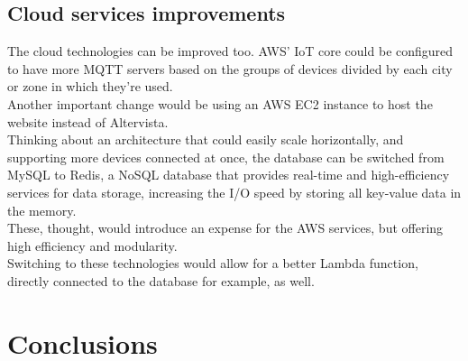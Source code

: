 \documentclass[conference]{IEEEtran}
\begin{document}
	\subsection{Cloud services improvements}
		The cloud technologies can be improved too.
		AWS' IoT core could be configured to have more MQTT servers based on the groups of devices divided by each city or zone in which they're used.\\
		Another important change would be using an AWS EC2 instance to host the website instead of Altervista.\\
		Thinking about an architecture that could easily scale horizontally, and supporting more devices connected at once, the database can be switched from MySQL to Redis,  a NoSQL database that provides real-time and high-efficiency services for data storage, increasing the I/O speed by storing all key-value data in the memory\cite{redis}.\\
		These, thought, would introduce an expense for the AWS services, but offering high efficiency and modularity.\\
		Switching to these technologies would allow for a better Lambda function, directly connected to the database for example, as well.
		
\section{Conclusions}\label{conclusions}
\end{document}
